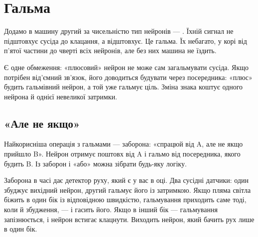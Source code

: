 \chapter{Гальма}

Додамо в машину другий за чисельністю тип нейронів --- . Їхній сигнал не підштовхує сусіда до клацання, а відштовхує. Це гальма. Їх небагато, у корі від п'ятої частини до чверті всіх нейронів, але без них машина не їздить.

Є одне обмеження: «плюсовий» нейрон не може сам загальмувати сусіда. Якщо потрібен від'ємний зв'язок, його доводиться будувати через посередника: «плюс» будить гальмівний нейрон, а той уже гальмує ціль. Зміна знака коштує одного нейрона й однієї невеликої затримки.

\section*{«Але не якщо»}

Найкорисніша операція з гальмами --- заборона: «спрацюй від A, але не якщо прийшло B». Нейрон отримує поштовх від A і гальмо від посередника, якого будить B. Із заборон і «або» можна зібрати будь-яку логіку.


Заборона в часі дає детектор руху, який є у вас в оці. Два сусідні датчики: один збуджує вихідний нейрон, другий гальмує його із затримкою. Якщо пляма світла біжить в один бік із відповідною швидкістю, гальмування приходить саме тоді, коли й збудження, --- і гасить його. Якщо в інший бік --- гальмування запізнюється, і нейрон встигає клацнути. Виходить нейрон, який бачить рух лише в один бік.

